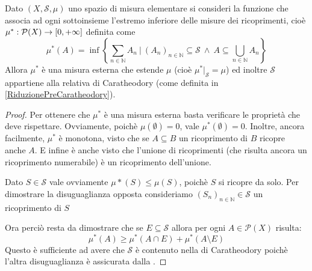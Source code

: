 \begin{proposition}\label{MisuraEsternaDiPremisura}
	Dato $(X,\mathcal S,\mu)$ uno spazio di misura elementare si consideri la funzione che associa ad ogni sottoinsieme l'estremo inferiore delle misure dei ricoprimenti, cioè $\mu^*:\mathcal P(X)\to[0,+\infty]$ definita come 
	\begin{equation*}
		\mu^*(A)=\inf\left\{\sum_{n\in\mathbb N} A_n\ |\ (A_n)_{n\in\mathbb N}\subseteq\mathcal S\ \wedge
		\ A\subseteq\bigcup_{n\in\mathbb N}A_n\right\}
	\end{equation*}
	Allora $\mu^*$ è una misura esterna che estende $\mu$ (cioè $\mu^*|_{\mathcal S}=\mu$) ed inoltre $\mathcal S$ appartiene alla relativa \sigalg{} di Caratheodory (come definita in \cref{RiduzionePreCaratheodory}).
\end{proposition}
\begin{proof}
	Per ottenere che $\mu^*$ è una misura esterna basta verificare le proprietà che deve rispettare.
	Ovviamente, poichè $\mu(\emptyset)=0$, vale $\mu^*(\emptyset)=0$. 
	Inoltre, ancora facilmente, $\mu^*$ è monotona, visto che se $A\subseteq B$ un ricoprimento di $B$ ricopre anche $A$.
	E infine è anche \sigsubadd{} visto che l'unione di ricoprimenti (che risulta ancora un ricoprimento numerabile) è un ricoprimento dell'unione.
	
	Dato $S\in\mathcal S$ vale ovviamente $\mu*(S)\le\mu(S)$, poichè $S$ si ricopre da solo. Per dimostrare la disuguaglianza opposta consideriamo $(S_n)_{n\in\mathbb N}\in \mathcal S$ un ricoprimento di $S$
	
	Ora perciò resta da dimostrare che se $E\subseteq \mathcal S$ allora per ogni $A\in\mathcal P(X)$ risulta:
	\begin{equation}\label{MisuraEsternaDisDifficile}
		\mu^*(A) \ge \mu^*(A\cap E)+\mu^*(A\setminus E)
	\end{equation}
	Questo è sufficiente ad avere che $\mathcal S$ è contenuto nella \sigalg{} di Caratheodory poichè l'altra disuguaglianza è assicurata dalla \sigsubadd[ità].
	

\end{proof}
